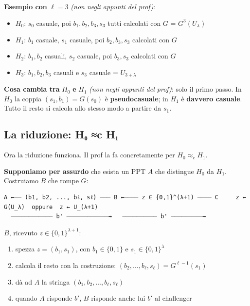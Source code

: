 \begin{esempio}

\textbf{Esempio con} \(\ell = 3\) \emph{(non negli appunti del prof)}:

\begin{itemize}
\tightlist
\item
  \(H_0\): \(s_0\) casuale, poi \(b_1, b_2, b_3, s_3\) tutti calcolati con \(G\) = \(G^3(U_\lambda)\)
\item
  \(H_1\): \(b_1\) casuale, \(s_1\) casuale, poi \(b_2, b_3, s_3\) calcolati con \(G\)
\item
  \(H_2\): \(b_1, b_2\) casuali, \(s_2\) casuale, poi \(b_3, s_3\) calcolati con \(G\)
\item
  \(H_3\): \(b_1, b_2, b_3\) casuali e \(s_3\) casuale = \(U_{3+\lambda}\)
\end{itemize}

\end{esempio}

\textbf{Cosa cambia tra} \(H_0\) \textbf{e} \(H_1\) \emph{(non negli appunti del prof)}: solo il primo passo. In \(H_0\) la coppia \((s_1, b_1) = G(s_0)\) è \textbf{pseudocasuale}; in \(H_1\) è \textbf{davvero casuale}. Tutto il resto si calcola allo stesso modo a partire da \(s_1\).

\subsection{La riduzione: H₀ ≈c H₁}

Ora la riduzione funziona. Il prof la fa concretamente per \(H_0 \approx_c H_1\).

\textbf{Supponiamo per assurdo} che esista un PPT \(A\) che distingue \(H_0\) da \(H_1\). Costruiamo \(B\) che rompe \(G\):

\begin{verbatim}
A ←── (b1, b2, ..., bℓ, sℓ) ─── B ←──── z ∈ {0,1}^(λ+1) ──── C     z ← G(U_λ)  oppure  z ← U_(λ+1)
  ──────────── b' ────────────→   ────────── b' ─────────→
\end{verbatim}

\(B\), ricevuto \(z \in \{0,1\}^{\lambda+1}\):

\begin{enumerate}
\def\labelenumi{\arabic{enumi}.}
\tightlist
\item
  spezza \(z = (b_1, s_1)\), con \(b_1 \in \{0,1\}\) e \(s_1 \in \{0,1\}^\lambda\)
\item
  calcola il resto con la costruzione: \((b_2, \dots, b_\ell, s_\ell) = G^{\ell-1}(s_1)\)
\item
  dà ad \(A\) la stringa \((b_1, b_2, \dots, b_\ell, s_\ell)\)
\item
  quando \(A\) risponde \(b'\), \(B\) risponde anche lui \(b'\) al challenger
\end{enumerate}

